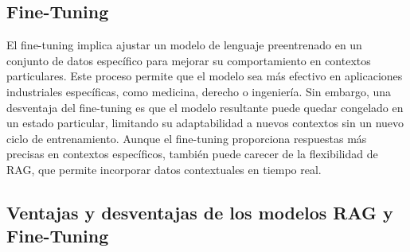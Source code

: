   \newpage
  
  \subsection{Fine-Tuning}
  El fine-tuning implica ajustar un modelo de lenguaje preentrenado en un conjunto de datos específico para mejorar su comportamiento en contextos particulares. Este proceso permite que el modelo sea más efectivo en aplicaciones industriales específicas, como medicina, derecho o ingeniería. Sin embargo, una desventaja del fine-tuning es que el modelo resultante puede quedar congelado en un estado particular, limitando su adaptabilidad a nuevos contextos sin un nuevo ciclo de entrenamiento.
  Aunque el fine-tuning proporciona respuestas más precisas en contextos específicos, también puede carecer de la flexibilidad de RAG, que permite incorporar datos contextuales en tiempo real.
   
  \newpage
\subsection{Ventajas y desventajas de los modelos RAG y Fine-Tuning}
  
